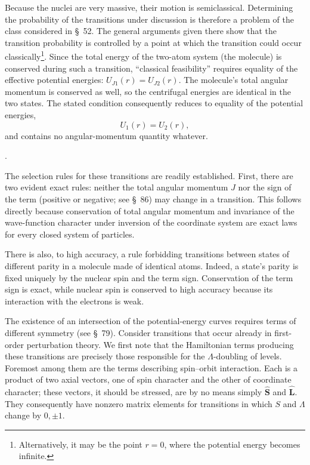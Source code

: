 Because the nuclei are very massive, their motion is semiclassical. Determining the probability of the transitions under discussion is therefore a problem of the class considered in \S~52. The general arguments given there show that the transition probability is controlled by a point at which the transition could occur classically\footnote{Alternatively, it may be the point $r=0$, where the potential energy becomes infinite.}. Since the total energy of the two-atom system (the molecule) is conserved during such a transition, ``classical feasibility'' requires equality of the effective potential energies: $U_{J1}(r)=U_{J2}(r)$. The molecule's total angular momentum is conserved as well, so the centrifugal energies are identical in the two states. The stated condition consequently reduces to equality of the potential energies,
\begin{equation}U_1(r)=U_2(r),\tag{90.1}\end{equation}
and contains no angular-momentum quantity whatever.

.






The selection rules for these transitions are readily established. First, there are two evident exact rules: neither the total angular momentum $J$ nor the sign of the term (positive or negative; see \S~86) may change in a transition. This follows directly because conservation of total angular momentum and invariance of the wave-function character under inversion of the coordinate system are exact laws for every closed system of particles.

There is also, to high accuracy, a rule forbidding transitions between states of different parity in a molecule made of identical atoms. Indeed, a state's parity is fixed uniquely by the nuclear spin and the term sign. Conservation of the term sign is exact, while nuclear spin is conserved to high accuracy because its interaction with the electrons is weak.

The existence of an intersection of the potential-energy curves requires terms of different symmetry (see \S~79). Consider transitions that occur already in first-order perturbation theory. We first note that the Hamiltonian terms producing these transitions are precisely those responsible for the $\Lambda$-doubling of levels. Foremost among them are the terms describing spin--orbit interaction. Each is a product of two axial vectors, one of spin character and the other of coordinate character; these vectors, it should be stressed, are by no means simply $\widehat{\mathbf S}$ and $\widehat{\mathbf L}$. They consequently have nonzero matrix elements for transitions in which $S$ and $\Lambda$ change by $0,\pm1$.

